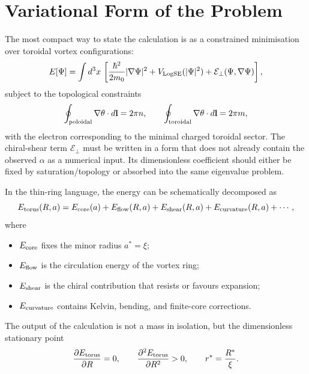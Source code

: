 \documentclass[11pt,a4paper]{article}
\newcommand{\mzero}{m_0}
\begin{document}
\section{Variational Form of the Problem}
\label{sec:variational}

The most compact way to state the calculation is as a constrained
minimisation over toroidal vortex configurations:
\begin{equation}
    E[\Psi]
    =
    \int d^3x\,
    \left[
        \frac{\hbar^2}{2\mzero}|\nabla\Psi|^2
        + V_{\rm LogSE}(|\Psi|^2)
        + \mathcal{E}_{\perp}(\Psi,\nabla\Psi)
    \right],
    \label{eq:functional}
\end{equation}
subject to the topological constraints
\begin{equation}
    \oint_{\rm poloidal}\nabla\theta\cdot d\mathbf{l}=2\pi n,
    \qquad
    \oint_{\rm toroidal}\nabla\theta\cdot d\mathbf{l}=2\pi m,
    \label{eq:constraints}
\end{equation}
with the electron corresponding to the minimal charged toroidal sector.
The chiral-shear term $\mathcal{E}_{\perp}$ must be written in a form that
does not already contain the observed $\alpha$ as a numerical input.  Its
dimensionless coefficient should either be fixed by saturation/topology or
absorbed into the same eigenvalue problem.

In the thin-ring language, the energy can be schematically decomposed as
\begin{equation}
    E_{\rm torus}(R,a)
    =
    E_{\rm core}(a)
    + E_{\rm flow}(R,a)
    + E_{\rm shear}(R,a)
    + E_{\rm curvature}(R,a)
    + \cdots ,
    \label{eq:energy_decomp}
\end{equation}
where
\begin{itemize}[leftmargin=2em]
    \item $E_{\rm core}$ fixes the minor radius $a^*=\xi$;
    \item $E_{\rm flow}$ is the circulation energy of the vortex ring;
    \item $E_{\rm shear}$ is the chiral contribution that resists or favours expansion;
    \item $E_{\rm curvature}$ contains Kelvin, bending, and finite-core corrections.
\end{itemize}
The output of the calculation is not a mass in isolation, but the
dimensionless stationary point
\begin{equation}
    \frac{\partial E_{\rm torus}}{\partial R}=0,
    \qquad
    \frac{\partial^2 E_{\rm torus}}{\partial R^2}>0,
    \qquad
    r^*=\frac{R^*}{\xi}.
    \label{eq:stationary}
\end{equation}
\end{document}
